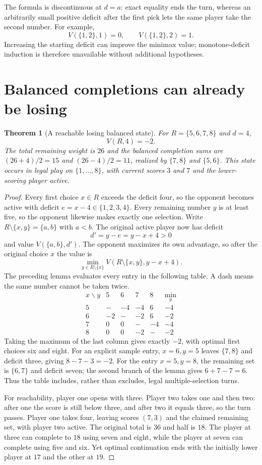 \documentclass[11pt]{article}
\newtheorem{theorem}{Theorem}
\theoremstyle{definition}
\begin{document}
The formula is discontinuous at $d=a$: exact equality ends the turn, whereas an arbitrarily small positive deficit after the first pick lets the same player take the second number. For example,
\[
 V(\{1,2\},1)=0,\qquad V(\{1,2\},2)=1.
\]
Increasing the starting deficit can improve the minimax value; monotone-deficit induction is therefore unavailable without additional hypotheses.

\section*{Balanced completions can already be losing}
\begin{theorem}[A reachable losing balanced state]
For $R=\{5,6,7,8\}$ and $d=4$,
\[
 V(R,4)=-2.
\]
The total remaining weight is $26$ and the balanced completion sums are $(26+4)/2=15$ and $(26-4)/2=11$, realized by $\{7,8\}$ and $\{5,6\}$. This state occurs in legal play on $\{1,\ldots,8\}$, with current scores $3$ and $7$ and the lower-scoring player active.
\end{theorem}
\begin{proof}
Every first choice $x\in R$ exceeds the deficit four, so the opponent becomes active with deficit $e=x-4\in\{1,2,3,4\}$. Every remaining number $y$ is at least five, so the opponent likewise makes exactly one selection. Write $R\setminus\{x,y\}=\{a,b\}$ with $a<b$. The original active player now has deficit
\[
 d'=y-e=y-x+4>0
\]
and value $V(\{a,b\},d')$. The opponent maximizes its own advantage, so after the original choice $x$ the value is
\[
 \min_{y\in R\setminus\{x\}}V(R\setminus\{x,y\},y-x+4).
\]
The preceding lemma evaluates every entry in the following table. A dash means the same number cannot be taken twice.
\[
\begin{array}{c|rrrr|r}
 x\backslash y&5&6&7&8&\min_y\\\hline
 5&-&-4&-4&6&-4\\
 6&-2&-&-2&6&-2\\
 7&0&0&-&-4&-4\\
 8&0&0&-2&-&-2
\end{array}
\]
Taking the maximum of the last column gives exactly $-2$, with optimal first choices six and eight. For an explicit sample entry, $x=6,y=5$ leaves $\{7,8\}$ and deficit three, giving $8-7-3=-2$. For the entry $x=5,y=8$, the remaining set is $\{6,7\}$ and deficit seven; the second branch of the lemma gives $6+7-7=6$. Thus the table includes, rather than excludes, legal multiple-selection turns.

For reachability, player one opens with three. Player two takes one and then two: after one the score is still below three, and after two it equals three, so the turn passes. Player one takes four, leaving scores $(7,3)$ and the claimed remaining set, with player two active. The original total is $36$ and half is $18$. The player at three can complete to $18$ using seven and eight, while the player at seven can complete using five and six. Yet optimal continuation ends with the initially lower player at $17$ and the other at $19$.
\end{proof}
\end{document}
